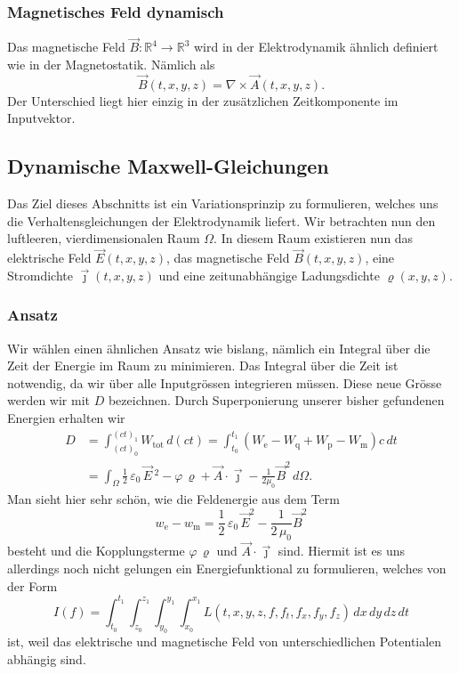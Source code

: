 \subsubsection{Magnetisches Feld dynamisch}
Das magnetische Feld
\(
\vec{B}: \mathbb{R}^4 \rightarrow \mathbb{R}^3
\)
wird in der Elektrodynamik ähnlich definiert wie in der Magnetostatik. Nämlich als
\begin{equation}
	\vec{B}(t,x,y,z)
	=
	\nabla \times \vec{A}(t,x,y,z).
	\label{maxwell:section:definition_dynamisch_magnetischesFeld}
\end{equation}
Der Unterschied liegt hier einzig in der zusätzlichen Zeitkomponente im Inputvektor.

\subsection{Dynamische Maxwell-Gleichungen}
Das Ziel dieses Abschnitts ist ein Variationsprinzip zu formulieren, welches uns die Verhaltensgleichungen der Elektrodynamik liefert. 
Wir betrachten nun den luftleeren, vierdimensionalen Raum $\Omega$.
In diesem Raum existieren nun das elektrische Feld $\vec{E}(t,x,y,z)$, das magnetische Feld $\vec{B}(t,x,y,z)$, eine Stromdichte $\vec{\jmath}(t,x,y,z)$ und eine zeitunabhängige Ladungsdichte $\varrho(x,y,z)$.

\subsubsection{Ansatz}
Wir wählen einen ähnlichen Ansatz wie bislang, nämlich ein Integral über die Zeit der Energie im Raum zu minimieren.
Das Integral über die Zeit ist notwendig, da wir über alle Inputgrössen integrieren müssen.
Diese neue Grösse werden wir mit $D$ bezeichnen.
Durch Superponierung unserer bisher gefundenen Energien erhalten wir
\begin{align*}
	D
	&=
	\int_{(ct)_0}^{(ct)_1} W_{\text{tot}}\,d(ct)
	=
	\int_{t_0}^{t_1} \left(W_{\text{e}} - W_{\text{q}} + W_{\text{p}} - W_{\text{m}}\right)c\,dt
	\\
	&= \int_{\Omega} \frac{1}{2}\,\varepsilon_0\,\vec{E}\,^2 - \varphi\,\varrho 
	+ \vec{A}\cdot\vec{\jmath} - \frac{1}{2\mu_0}\vec{B}^2 \,d\Omega.
\end{align*}
Man sieht hier sehr schön, wie die Feldenergie aus dem Term
\[
w_{\text{e}} - w_{\text{m}}
=
\frac{1}{2}\,\varepsilon_0\,\vec{E}^2 - \frac{1}{2\,\mu_0}\vec{B}^2
\]
besteht und die Kopplungsterme 
\(
\varphi\,\varrho
\)
und
\(
\vec{A}\cdot\vec{\jmath}
\)
sind.
Hiermit ist es uns allerdings noch nicht gelungen ein Energiefunktional zu formulieren, welches von der Form
\[
I(f) = \int_{t_0}^{t_1} \int_{z_0}^{z_1} \int_{y_0}^{y_1} \int_{x_0}^{x_1} L(t,x,y,z,f,f_t,f_x,f_y,f_z)\,dx\,dy\,dz\,dt 
\]
ist, weil das elektrische und magnetische Feld von unterschiedlichen Potentialen abhängig sind.

